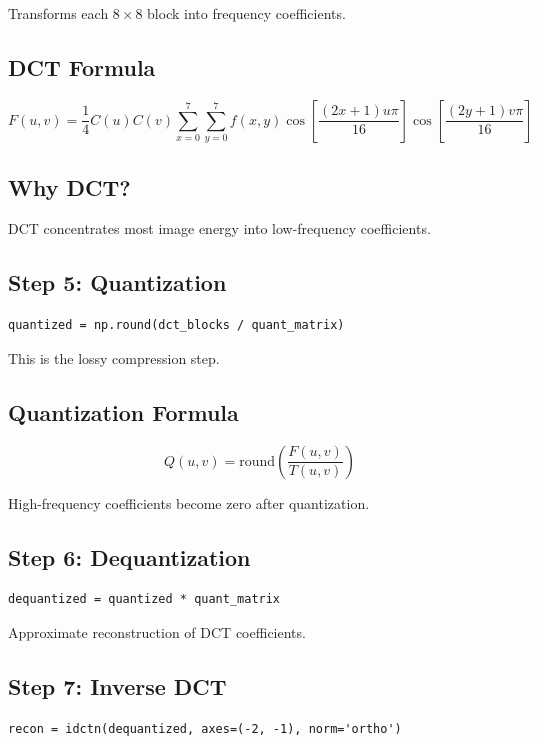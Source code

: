 \documentclass[12pt,a4paper]{article}
\begin{document}
Transforms each \(8 \times 8\) block into frequency coefficients.

\subsection{DCT Formula}

\[
F(u,v)=\frac{1}{4}C(u)C(v)\sum_{x=0}^{7}\sum_{y=0}^{7}
f(x,y)\cos\left[\frac{(2x+1)u\pi}{16}\right]
\cos\left[\frac{(2y+1)v\pi}{16}\right]
\]

\subsection{Why DCT?}

DCT concentrates most image energy into low-frequency coefficients.

\subsection{Step 5: Quantization}

\begin{lstlisting}
quantized = np.round(dct_blocks / quant_matrix)
\end{lstlisting}

This is the lossy compression step.

\subsection{Quantization Formula}

\[
Q(u,v)=\text{round}\left(\frac{F(u,v)}{T(u,v)}\right)
\]

High-frequency coefficients become zero after quantization.

\subsection{Step 6: Dequantization}

\begin{lstlisting}
dequantized = quantized * quant_matrix
\end{lstlisting}

Approximate reconstruction of DCT coefficients.

\subsection{Step 7: Inverse DCT}

\begin{lstlisting}
recon = idctn(dequantized, axes=(-2, -1), norm='ortho')
\end{lstlisting}
\end{document}
